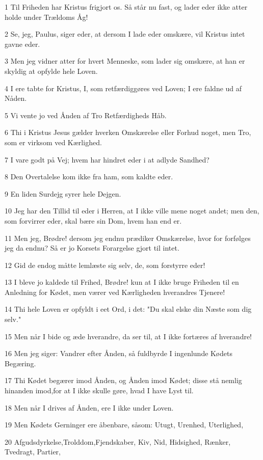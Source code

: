 \par 1 Til Friheden har Kristus frigjort os. Så står nu fast, og lader eder ikke atter holde under Trældoms Åg!
\par 2 Se, jeg, Paulus, siger eder, at dersom I lade eder omskære, vil Kristus intet gavne eder.
\par 3 Men jeg vidner atter for hvert Menneske, som lader sig omskære, at han er skyldig at opfylde hele Loven.
\par 4 I ere tabte for Kristus, I, som retfærdiggøres ved Loven; I ere faldne ud af Nåden.
\par 5 Vi vente jo ved Ånden af Tro Retfærdigheds Håb.
\par 6 Thi i Kristus Jesus gælder hverken Omskærelse eller Forhud noget, men Tro, som er virksom ved Kærlighed.
\par 7 I vare godt på Vej; hvem har hindret eder i at adlyde Sandhed?
\par 8 Den Overtalelse kom ikke fra ham, som kaldte eder.
\par 9 En liden Surdejg syrer hele Dejgen.
\par 10 Jeg har den Tillid til eder i Herren, at I ikke ville mene noget andet; men den, som forvirrer eder, skal bære sin Dom, hvem han end er.
\par 11 Men jeg, Brødre! dersom jeg endnu prædiker Omskærelse, hvor for forfølges jeg da endnu? Så er jo Korsets Forargelse gjort til intet.
\par 12 Gid de endog måtte lemlæste sig selv, de, som forstyrre eder!
\par 13 I bleve jo kaldede til Frihed, Brødre! kun at I ikke bruge Friheden til en Anledning for Kødet, men værer ved Kærligheden hverandres Tjenere!
\par 14 Thi hele Loven er opfyldt i eet Ord, i det: "Du skal elske din Næste som dig selv."
\par 15 Men når I bide og æde hverandre, da ser til, at I ikke fortæres af hverandre!
\par 16 Men jeg siger: Vandrer efter Ånden, så fuldbyrde I ingenlunde Kødets Begæring.
\par 17 Thi Kødet begærer imod Ånden, og Ånden imod Kødet; disse stå nemlig hinanden imod,for at I ikke skulle gøre, hvad I have Lyst til.
\par 18 Men når I drives af Ånden, ere I ikke under Loven.
\par 19 Men Kødets Gerninger ere åbenbare, såsom: Utugt, Urenhed, Uterlighed,
\par 20 Afgudsdyrkelse,Trolddom,Fjendskaber, Kiv, Nid, Hidsighed, Rænker, Tvedragt, Partier,
